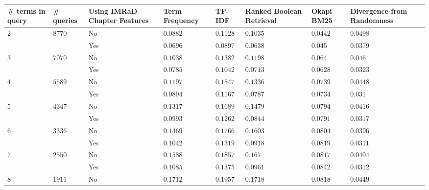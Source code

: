 \begin{table}[b]
  \begin{adjustwidth}{-2cm}{}
    \begin{tabular}{ C{1cm} C{1cm} C{2.1cm} C{2.1cm} C{2.1cm} C{2.1cm} C{2.1cm} C{2.1cm} }
      \toprule
      \textbf{\# terms in query} & \textbf{\# queries} & \textbf{Using IMRaD Chapter Features} & \textbf{Term Frequency} & \textbf{TF-IDF} & \textbf{Ranked Boolean Retrieval} & \textbf{Okapi BM25} & \textbf{Divergence from Randomness} \\ \midrule
       &  & No  & $0.0882$ & $0.1128$ & $0.1035$ & $0.0442$ & \color{blue}$\mathbf{0.0498}$  \\
                                                    && Yes & $0.0696$ & $0.0897$ & $0.0638$ & $0.045$  & \color{Plum}$\mathbf{0.0379}$  \\ \midrule
       &  & No  & $0.1038$ & $0.1382$ & $0.1198$ & $0.064$  & $0.046$   \\
                                                    && Yes & $0.0785$ & $0.1042$ & $0.0713$ & $0.0628$ & $0.0323$  \\ \midrule
       &  & No  & $0.1197$ & $0.1547$ & $0.1336$ & $0.0739$ & $0.0448$  \\
                                                    && Yes & $0.0894$ & $0.1167$ & $0.0787$ & $0.0734$ & $0.031$   \\ \midrule
       &  & No  & $0.1317$ & $0.1689$ & $0.1479$ & $0.0794$ & $0.0416$  \\
                                                    && Yes & $0.0993$ & $0.1262$ & $0.0844$ & $0.0791$ & $0.0317$  \\ \midrule
       &  & No  & $0.1469$ & $0.1766$ & $0.1603$ & $0.0804$ & $0.0396$  \\
                                                    && Yes & $0.1042$ & $0.1319$ & $0.0918$ & $0.0819$ & $0.0311$  \\ \midrule
       &  & No  & $0.1588$ & $0.1857$ & $0.167$  & $0.0817$ & $0.0404$  \\
                                                    && Yes & $0.1085$ & $0.1375$ & $0.0961$ & $0.0842$ & $0.0312$  \\ \midrule
       &  & No  & $0.1712$ & $0.1957$ & $0.1718$ & $0.0818$ & $0.0449$  \\

\end{tabular}
\end{adjustwidth}
\end{table}
